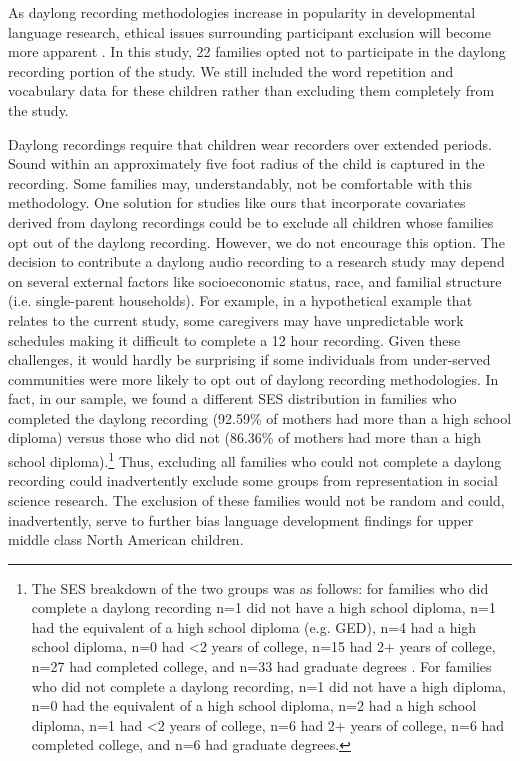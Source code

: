 \documentclass[a4paper,man,natbib,donotrepeattitle, apacite]{apa6}
\begin{document}
As daylong recording methodologies increase in popularity in developmental language research, ethical issues surrounding participant exclusion will become more apparent \cite{casillasStepbystepGuideCollecting2019}. In this study, 22 families opted not to participate in the daylong recording portion of the study. We still included the word repetition and vocabulary data for these children rather than excluding them completely from the study. 

Daylong recordings require that children wear recorders over extended periods. Sound within an approximately five foot radius of the child is captured in the recording. Some families may, understandably, not be comfortable with this methodology. One solution for studies like ours that incorporate covariates derived from daylong recordings could be to exclude all children whose families opt out of the daylong recording. However, we do not encourage this option. The decision to contribute a daylong audio recording to a research study may depend on several external factors like socioeconomic status, race, and familial structure (i.e. single-parent households). For example, in a hypothetical example that relates to the current study, some caregivers may have unpredictable work schedules making it difficult to complete a 12 hour recording. Given these challenges, it would hardly be surprising if some individuals from under-served communities were more likely to opt out of daylong recording methodologies. In fact, in our sample, we found a different SES distribution in families who completed the daylong recording (92.59\% of mothers had more than a high school diploma) versus those who did not (86.36\% of mothers had more than a high school diploma).\footnote{ The SES breakdown of the two groups was as follows: for families who did complete a daylong recording n=1 did not have a high school diploma, n=1 had the equivalent of a high school diploma (e.g. GED), n=4 had a high school diploma, n=0 had <2 years of college, n=15 had 2+ years of college, n=27 had completed college, and n=33 had graduate degrees . For families who did not complete a daylong recording, n=1 did not have a high diploma, n=0 had the equivalent of a high school diploma, n=2 had a high school diploma, n=1 had <2 years of college, n=6 had 2+ years of college, n=6 had completed college, and n=6 had graduate degrees.} Thus, excluding all families who could not complete a daylong recording could inadvertently exclude some groups from representation in social science research. The exclusion of these families would not be random and could, inadvertently, serve to further bias language development findings for upper middle class North American children. 
\end{document}
